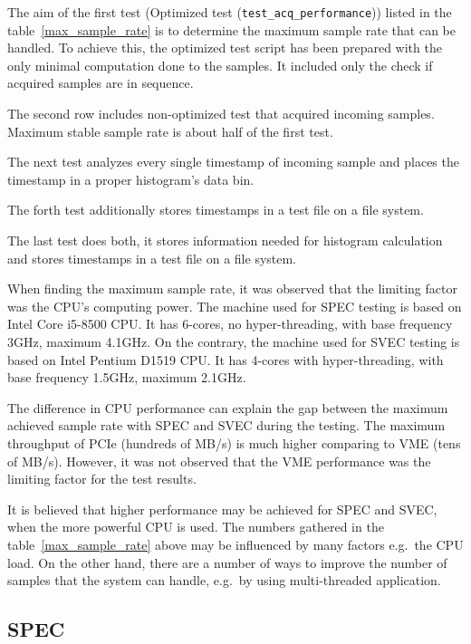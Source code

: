 \documentclass[a4paper, 12pt]{article}
\begin{document}
The aim of the first test (Optimized test (\texttt{test\_acq\_performance}))
listed in the table~\ref{max_sample_rate} is to determine the maximum
sample rate that can be handled. To achieve this, the optimized test script
has been prepared with the only minimal computation done to the samples.
It included only the check if acquired samples are in sequence.

The second row includes non-optimized test that acquired incoming samples.
Maximum stable sample rate is about half of the first test.

The next test analyzes every single timestamp of incoming sample and places
the timestamp in a proper histogram's data bin.

The forth test additionally stores timestamps in a test file on a file system.

The last test does both, it stores information needed for histogram calculation
and stores timestamps in a test file on a file system.

When finding the maximum sample rate, it was observed that the limiting factor
was the CPU's computing power.
The machine used for SPEC testing is based on Intel Core i5-8500\cite{spec.cpu}
CPU.
It has 6-cores, no hyper-threading, with base frequency 3GHz, maximum 4.1GHz.
On the contrary, the machine used for SVEC testing is based on
Intel Pentium D1519\cite{svec.cpu} CPU.
It has 4-cores with hyper-threading, with base frequency 1.5GHz, maximum 2.1GHz.

The difference in CPU performance can explain the gap between
the maximum achieved sample rate with SPEC and SVEC during the testing.
The maximum throughput of PCIe (hundreds of MB/s) is much higher comparing to
VME (tens of MB/s).
However, it was not observed that the VME performance was the limiting factor
for the test results.

It is believed that higher performance may be achieved for SPEC and SVEC, when
the more powerful CPU is used. The numbers gathered in the
table~\ref{max_sample_rate} above may be influenced by many factors e.g.~the
CPU load.
On the other hand, there are a number of ways to improve the number of samples
that the system can handle, e.g.~by using multi-threaded application.

\subsection{SPEC}
\label{perf_spec}
\end{document}
